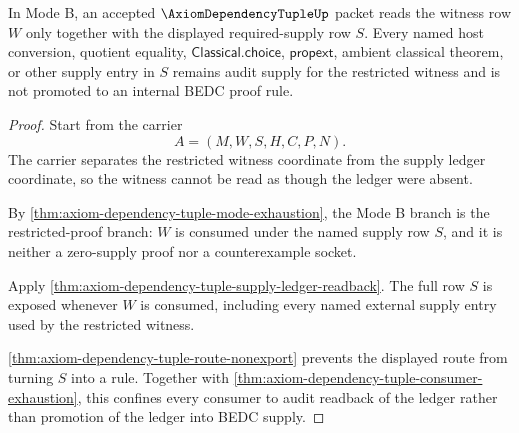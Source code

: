 \begin{theorem}
\label{thm:axiom-dependency-tuple-restricted-supply-ledger-nonpromotion}
In Mode B, an accepted $\AxiomDependencyTupleUp$ packet reads the witness row
$W$ only together with the displayed required-supply row $S$. Every named host
conversion, quotient equality, $\mathsf{Classical.choice}$,
$\mathsf{propext}$, ambient classical theorem, or other supply entry in $S$
remains audit supply for the restricted witness and is not promoted to an
internal BEDC proof rule.
\end{theorem}
\begin{proof}
Start from the carrier
$$
A=(M,W,S,H,C,P,N).
$$
The carrier separates the restricted witness coordinate from the supply ledger
coordinate, so the witness cannot be read as though the ledger were absent.

By \autoref{thm:axiom-dependency-tuple-mode-exhaustion}, the Mode B branch is
the restricted-proof branch: $W$ is consumed under the named supply row $S$,
and it is neither a zero-supply proof nor a counterexample socket.

Apply \autoref{thm:axiom-dependency-tuple-supply-ledger-readback}. The full
row $S$ is exposed whenever $W$ is consumed, including every named external
supply entry used by the restricted witness.

\autoref{thm:axiom-dependency-tuple-route-nonexport} prevents the displayed
route from turning $S$ into a rule. Together with
\autoref{thm:axiom-dependency-tuple-consumer-exhaustion}, this confines every
consumer to audit readback of the ledger rather than promotion of the ledger
into BEDC supply.
\end{proof}

